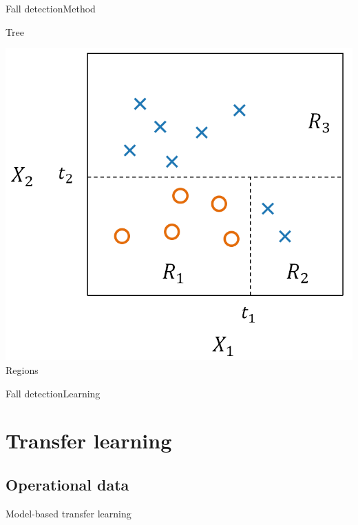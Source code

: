 \documentclass[8pt,t,aspectratio=1610]{beamer}
\begin{document}
\begin{frame}{Fall detection}{Method}
\begin{minipage}[t]{0.49\linewidth}
\begin{minipage}[t]{0.49\linewidth}
    {\small Tree}
    \end{minipage}
    \begin{minipage}[t]{0.49\linewidth}
        \vspace{0pt}
        \centering
        \includegraphics[width=0.95\linewidth, trim= 0 0 0 0, clip]{schema_decision_tree_3.png}\\
    {\small Regions}
    \end{minipage}
\end{minipage}
    
\end{frame}

\begin{frame}{Fall detection}{Learning}

\end{frame}














\section{Transfer learning}
\subsection{Operational data}
\begin{frame}{Model-based transfer learning}{}

\end{frame}
\end{document}
